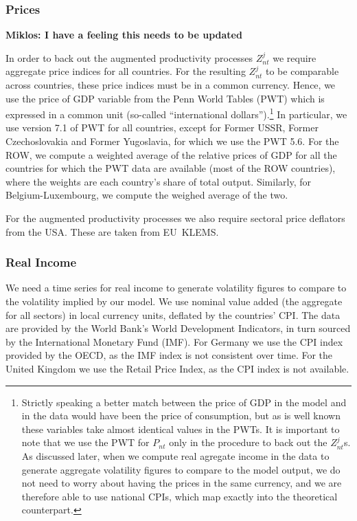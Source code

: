 \documentclass[12pt]{article}
\begin{document}
\subsubsection*{Prices}

\textbf{Miklos: I have a feeling this needs to be updated}

In order to back out the augmented productivity processes $Z_{nt}^{j}$ we
require aggregate price indices for all countries. For the resulting $%
Z_{nt}^{j}$ to be comparable across countries, these price indices must be
in a common currency. Hence, we use the price of GDP variable from the Penn
World Tables (PWT) which is expressed in a common unit (so-called
\textquotedblleft international dollars\textquotedblright ).\footnote{%
Strictly speaking a better match between the price of GDP in the model and
in the data would have been the price of consumption, but as is well known
these variables take almost identical values in the PWTs. It is important to
note that we use the PWT for $P_{nt}$ only in the procedure to back out the $%
Z_{nt}^{j}$s. As discussed later, when we compute real agregate income in
the data to generate aggregate volatility figures to compare to the model
output, we do not need to worry about having the prices in the same
currency, and we are therefore able to use national CPIs, which map exactly
into the theoretical counterpart.} In particular, we use version 7.1 of PWT
for all countries, except for Former USSR, Former Czechoslovakia and Former
Yugoslavia, for which we use the PWT 5.6. For the ROW, we compute a weighted
average of the relative prices of GDP for all the countries for which the
PWT data are available (most of the ROW countries), where the weights are
each country's share of total output. Similarly, for Belgium-Luxembourg, we
compute the weighed average of the two.

For the augmented productivity processes we also require sectoral price
deflators from the USA. These are taken from EU\ KLEMS.

\subsubsection*{Real Income}

We need a time series for real income to generate volatility figures to
compare to the volatility implied by our model. We use nominal value added
(the aggregate for all sectors) in local currency units, deflated by the
countries' CPI. The data are provided by the World Bank's World Development
Indicators, in turn sourced by the International Monetary Fund (IMF). For
Germany we use the CPI index provided by the OECD, as the IMF index is not
consistent over time. For the United Kingdom we use the Retail Price Index,
as the CPI index is not available.
\end{document}
